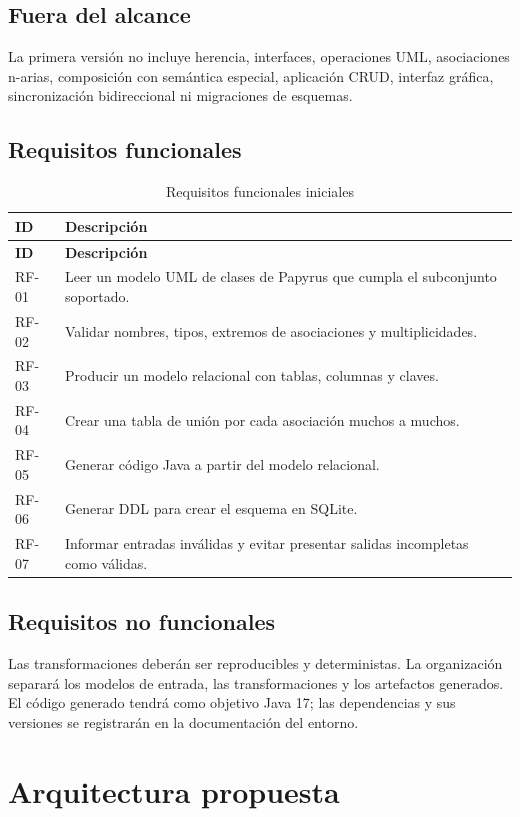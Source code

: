 \documentclass[12pt,a4paper,oneside]{report}
\begin{document}
\section{Fuera del alcance}
La primera versión no incluye herencia, interfaces, operaciones UML, asociaciones n-arias, composición con semántica especial, aplicación CRUD, interfaz gráfica, sincronización bidireccional ni migraciones de esquemas.

\section{Requisitos funcionales}
\begin{longtable}{p{}p{}}
\caption{Requisitos funcionales iniciales}\label{tab:rf}\\
\toprule
\textbf{ID} & \textbf{Descripción}\\
\midrule
\endfirsthead
\toprule
\textbf{ID} & \textbf{Descripción}\\
\midrule
\endhead
RF-01 & Leer un modelo UML de clases de Papyrus que cumpla el subconjunto soportado.\\
RF-02 & Validar nombres, tipos, extremos de asociaciones y multiplicidades.\\
RF-03 & Producir un modelo relacional con tablas, columnas y claves.\\
RF-04 & Crear una tabla de unión por cada asociación muchos a muchos.\\
RF-05 & Generar código Java a partir del modelo relacional.\\
RF-06 & Generar DDL para crear el esquema en SQLite.\\
RF-07 & Informar entradas inválidas y evitar presentar salidas incompletas como válidas.\\
\bottomrule
\end{longtable}

\section{Requisitos no funcionales}
Las transformaciones deberán ser reproducibles y deterministas. La organización separará los modelos de entrada, las transformaciones y los artefactos generados. El código generado tendrá como objetivo Java 17; las dependencias y sus versiones se registrarán en la documentación del entorno.

\chapter{Arquitectura propuesta}
\end{document}
